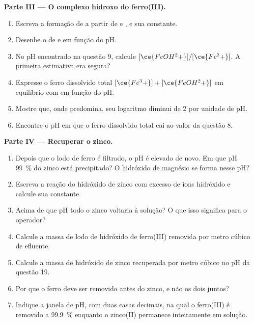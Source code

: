 \begin{problem}
\medskip
\noindent\textbf{Parte III --- O complexo hidroxo do ferro(III).}
\begin{enumerate}[resume]
  \item Escreva a formação de  a partir de  e
        , e sua constante.
  \item Desenhe o  de  e 
        em função do pH.
  \item No pH encontrado na questão 9, calcule
        $[\ce{FeOH^2+}]/[\ce{Fe^3+}]$. A primeira estimativa era segura?
  \item Expresse o ferro dissolvido total $[\ce{Fe^3+}] + [\ce{FeOH^2+}]$
        em equilíbrio com  em função do pH.
  \item Mostre que, onde  predomina, seu logaritmo diminui
        de 2 por unidade de pH.
  \item Encontre o pH em que o ferro dissolvido total cai ao valor da
        questão 8.
\end{enumerate}

\medskip
\noindent\textbf{Parte IV --- Recuperar o zinco.}
\begin{enumerate}[resume]
  \item Depois que o lodo de ferro é filtrado, o pH é elevado de novo. Em
        que pH \qty{99}{\percent} do zinco está precipitado? O hidróxido
        de magnésio se forma nesse pH?
  \item Escreva a reação do hidróxido de zinco com excesso de íons
        hidróxido e calcule sua constante.
  \item Acima de que pH todo o zinco voltaria à solução? O que isso
        significa para o operador?
  \item Calcule a massa de lodo de hidróxido de ferro(III) removida por
        metro cúbico de efluente.
  \item Calcule a massa de hidróxido de zinco recuperada por metro cúbico
        no pH da questão 19.
  \item Por que o ferro deve ser removido antes do zinco, e não os dois
        juntos?
  \item Indique a janela de pH, com duas casas decimais, na qual o
        ferro(III) é removido a \qty{99.9}{\percent} enquanto o zinco(II)
        permanece inteiramente em solução.
\end{enumerate}
\end{problem}

